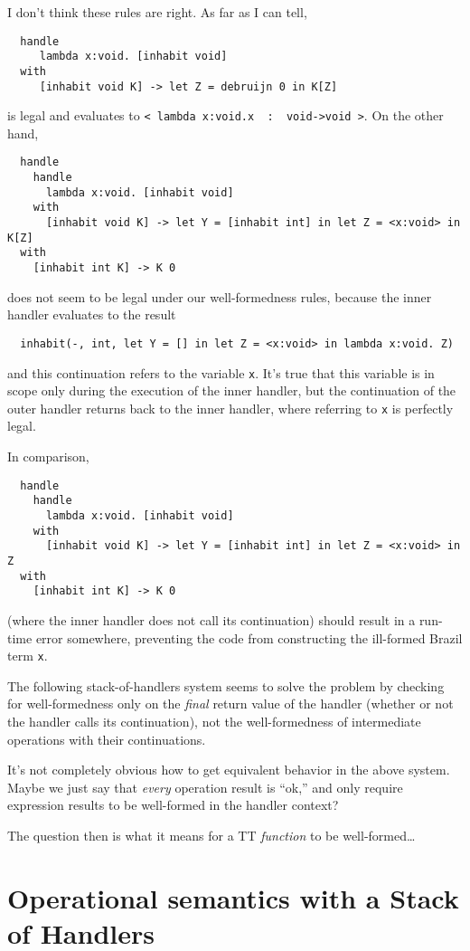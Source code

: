 \documentclass{article}
\begin{document}
I don't think these rules are right. As far as I can tell,
\begin{verbatim}
  handle
     lambda x:void. [inhabit void]
  with
     [inhabit void K] -> let Z = debruijn 0 in K[Z]
\end{verbatim}
is legal and evaluates to \verb|< lambda x:void.x  :  void->void >|. On the other hand,
\begin{verbatim}
  handle
    handle
      lambda x:void. [inhabit void]
    with
      [inhabit void K] -> let Y = [inhabit int] in let Z = <x:void> in K[Z]
  with
    [inhabit int K] -> K 0
\end{verbatim}
does not seem to be legal under our well-formedness rules, because the inner handler evaluates to the result
\begin{verbatim}
  inhabit(-, int, let Y = [] in let Z = <x:void> in lambda x:void. Z)
\end{verbatim}
and this continuation refers to the variable \verb|x|. It's true that this variable
is in scope only during the execution of the inner handler, but the continuation of the
outer handler returns back to the inner handler, where referring to \verb|x| is
perfectly legal.

In comparison,
\begin{verbatim}
  handle
    handle
      lambda x:void. [inhabit void]
    with
      [inhabit void K] -> let Y = [inhabit int] in let Z = <x:void> in Z
  with
    [inhabit int K] -> K 0
\end{verbatim}
(where the inner handler does not call its continuation) should result in a run-time error somewhere,
preventing the code from constructing the ill-formed Brazil term \verb|x|.

The following stack-of-handlers system seems to solve the problem by checking for well-formedness only
on the \emph{final} return value of the handler (whether or not the handler calls its
continuation), not the well-formedness of intermediate operations with their continuations.

It's not completely obvious how to get equivalent behavior in the above system.
Maybe we just say that \emph{every} operation result is ``ok,'' and only require
expression results to be well-formed in the handler context?

The question then is what it means for a TT \emph{function} to be well-formed\ldots
\fi

\section{Operational semantics with a Stack of Handlers}
\label{sec:oper-semant-stack}
\end{document}
